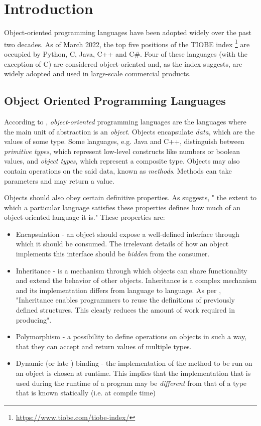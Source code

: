 \chapter{Introduction}
\label{chap:intro}



\label{sec:section}
Object-oriented programming languages have been adopted widely over the past two decades.
As of March 2022, the top five positions of the TIOBE index \footnote{\url{https://www.tiobe.com/tiobe-index/}} are occupied by Python, C, Java, C++ and C\#.
Four of these languages (with the exception of C) are considered object-oriented and, as the index suggests,
are widely adopted and used in large-scale commercial products.

\section{Object Oriented Programming Languages}
According to \cite{oop1}, \textit{object-oriented} programming languages are the languages where the main unit of abstraction is an \textit{object}.
Objects encapsulate \textit{data}, which are the values of some type.
Some languages, e.g. Java and C++, distinguish between \textit{primitive types},
which represent low-level constructs like numbers or boolean values, and \textit{object types},
which represent a composite type. Objects may also contain operations on the said data,
known as \textit{methods}. Methods can take parameters and may return a value.

Objects should also obey certain definitive properties. As \cite{oop1} suggests, " the extent to which a particular language satisfies these properties defines how much of an object-oriented language it is." These properties are:
\begin{itemize}
      \item Encapsulation - an object should expose a well-defined interface through which it should be consumed. The irrelevant details of how an object implements this interface should be \textit{hidden} from the consumer.
      \item Inheritance - is a mechanism through which objects can share functionality and extend the behavior of other objects. Inheritance is a complex mechanism and its implementation differs from language to language. As per \cite{oop1}, "Inheritance enables programmers to reuse the definitions of previously defined structures. This clearly reduces the amount of work required in producing".
      \item Polymorphism - a possibility to define operations on objects in such a way, that they can accept and return values of multiple types.
      \item Dynamic (or late \cite{alankay}) binding - the implementation of the method to be run on an object is chosen at runtime. This implies that the implementation that is used during the runtime of a program may be \textit{different} from that of a type that is known statically (i.e. at compile time)
\end{itemize}

